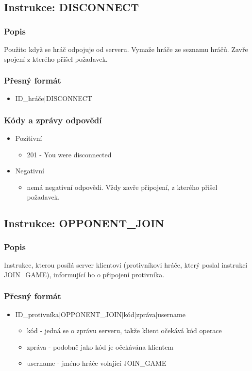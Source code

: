 \documentclass[12pt]{report}
\begin{document}
\subsection{Instrukce: DISCONNECT}
\subsubsection{Popis}
Použito když se hráč odpojuje od serveru. Vymaže hráče ze seznamu hráčů. Zavře spojení z kterého 
přišel požadavek.

\subsubsection{Přesný formát}
\begin{itemize}
	\item ID\_hráče$|$DISCONNECT
\end{itemize}

\subsubsection{Kódy a zprávy odpovědí}
\begin{itemize}
	\item Pozitivní
		\begin{itemize}
			\item 201 - You were disconnected
		\end{itemize}
	\item Negativní
		\begin{itemize}
			\item nemá negativní odpovědi. Vždy zavře připojení, z kterého přišel požadavek.
		\end{itemize}
\end{itemize}
%
%
%
\subsection{Instrukce: OPPONENT\_JOIN}
\subsubsection{Popis}
Instrukce, kterou posílá server klientovi (protivníkovi hráče, který poslal instrukci JOIN\_GAME),
informující ho o připojení protivníka.

\subsubsection{Přesný formát}
\begin{itemize}
	\item ID\_protivníka$|$OPPONENT\_JOIN$|$kód$|$zpráva$|$username
		\begin{itemize}
			\item kód - jedná se o zprávu serveru, takže klient očekává kód operace
			\item zpráva - podobně jako kód je očekávána klientem
			\item username - jméno hráče volající JOIN\_GAME
		\end{itemize}
\end{itemize}
\end{document}
